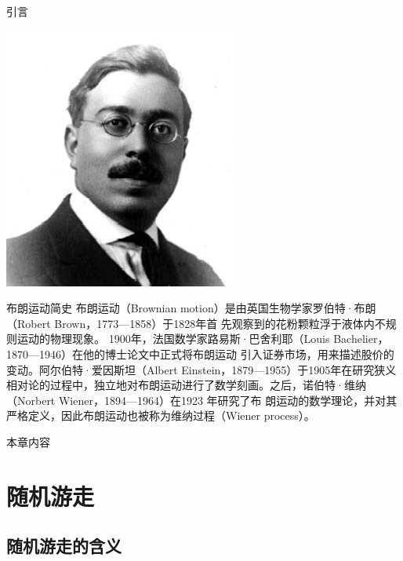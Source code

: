 \documentclass[t]{beamer}
\begin{document}
\begin{frame}{引言}
\begin{center}
\includegraphics[height=.35\textheight]{fig/wiener.jpeg}
    \end{center}
  \end{frame}

\begin{frame}{布朗运动简史}
  布朗运动（Brownian motion）是由英国生物学家罗伯特·布朗（Robert Brown，1773---1858）于1828年首
先观察到的花粉颗粒浮于液体内不规则运动的物理现象。
1900年，法国数学家路易斯·巴舍利耶（Louis Bachelier，1870---1946）在他的博士论文中正式将布朗运动
引入证券市场，用来描述股价的变动。阿尔伯特·爱因斯坦（Albert Einstein，1879---1955）于1905年在研究狭义相对论的过程中，独立地对布朗运动进行了数学刻画。之后，诺伯特·维纳（Norbert Wiener，1894---1964）在1923 年研究了布
朗运动的数学理论，并对其严格定义，因此布朗运动也被称为维纳过程（Wiener process）。
\end{frame}



\begin{frame}{本章内容}\small
\begin{spacing}{1.2}
  \begin{multicols}{2}
    \tableofcontents
  \end{multicols} 
\end{spacing} 
\end{frame}


\section{随机游走}

\subsection{随机游走的含义}
\end{document}
